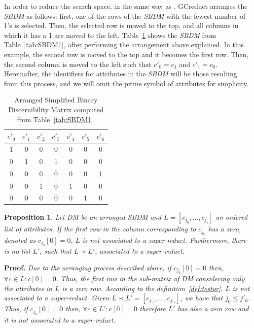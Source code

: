 \documentclass[number,preprint,review,12pt]{elsarticle}
\newtheorem{proposition}{Proposition}
\begin{document}
	\label{arrange}
	In order to reduce the search space, in the same way as \citep{Sanchez07,Lias13}, GCreduct arranges the \textit{SBDM} as follows: first, one of the rows of the \textit{SBDM} with the fewest number of 1's is selected. Then, the selected row is moved to the top, and all columns in which it has a 1 are moved to the left. Table~\ref{tab:SSBDM1} shows the \textit{SBDM} from Table~\ref{tab:SBDM1}, after performing the arrangement above explained. In this example, the second row is moved to the top and it becomes the first row. Then, the second column is moved to the left such that $c'_0 = c_1$ and $c'_1 = c_0$. Hereinafter, the identifiers for attributes in the \textit{SBDM} will be those resulting from this process, and we will omit the prime symbol of attributes for simplicity.
			
	\begin{table}[htb]
		\caption{Arranged Simplified Binary Discernibility Matrix computed from Table~\ref{tab:SBDM1}.}
		\centering
		\begin{tabular}{ccccccc}\label{tab:SSBDM1}
			$c'_0$ & $c'_1$ & $c'_2$ & $c'_3$ & $c'_4$ & $c'_5$ & $c'_6$\\
			\hline
			1&0&0&0&0&0&0\\
			0&1&0&1&0&0&0\\
			0&0&0&0&0&0&1\\
			0&0&1&0&1&0&0\\
			0&0&0&0&0&1&0\\
		\end{tabular}             
	\end{table}  
	
	\begin{proposition}\label{prop:firstRow}
		Let DM be an arranged SBDM and $L = [c_{j_0},...,c_{j_s}]$ an ordered list of attributes. If the first row in the column corresponding to $c_{j_0}$ has a zero, denoted as $c_{j_0}[0]=0$, $L$ is not associated to a super-reduct. Furthermore, there is no list $L'$, such that $L\prec L'$, associated to a super-reduct.
	\end{proposition}
	
	\noindent
	\textbf{Proof.} \textit{Due to the arranging process described above, if $c_{j_0}[0]=0$ then, $\forall c \in L: c[0]=0$. Thus, the first row in the sub-matrix of DM considering only the attributes in $L$ is a zero row. According to the definition~\ref{def:testor}, $L$ is not associated to a super-reduct. Given $L \prec L'= [c_{j'_0},...,c_{j'_s}]$, we have that $j_0 \leq j'_0$. Thus, if $c_{j_0}[0]=0$ then, $\forall c \in L': c[0]=0$ therefore $L'$ has also a zero row and it is not associated to a super-reduct.}
	
\end{document}
